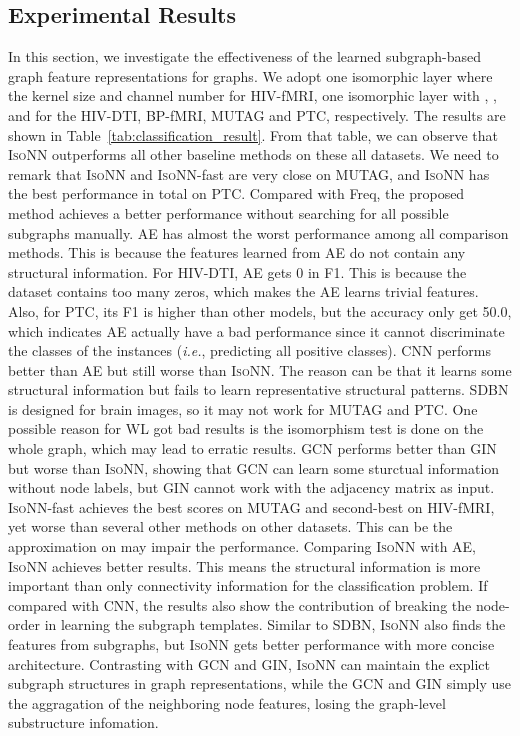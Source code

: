 \documentclass{article} \usepackage{iclr2020_conference,times}
\newcommand{\ie}[0]{\textit{i.e.}}
\newcommand{\our}{\textsc{IsoNN}}
\newcommand{\ourfast}{\textsc{IsoNN}-fast}
\begin{document}
\subsection{Experimental Results}
\vspace*{-8pt}
In this section, we investigate the effectiveness of the learned subgraph-based graph feature representations for graphs. We adopt one isomorphic layer where the kernel size  and channel number  for HIV-fMRI, one isomorphic layer with , ,  and  for the HIV-DTI, BP-fMRI, MUTAG and PTC, respectively. The results are shown in Table~\ref{tab:classification_result}. From that table, we can observe that {\our} outperforms all other baseline methods on these all datasets.  We need to remark that  {\our} and {\ourfast} are very close on MUTAG, and {\our} has the best performance in total on PTC. Compared with Freq, the proposed method achieves a better performance without searching for all possible subgraphs manually. AE has almost the worst performance among all comparison methods. This is because the features learned from AE do not contain any structural information. For HIV-DTI, AE gets 0 in F1. This is because the dataset contains too many zeros, which makes the AE learns trivial features. Also, for PTC, its F1 is higher than other models, but the accuracy only get 50.0, which indicates AE actually have a bad performance since it cannot discriminate the classes of the instances (\ie, predicting all positive classes).  CNN performs better than AE but still worse than {\our}. The reason can be that it learns some structural information but fails to learn representative structural patterns. SDBN is designed for brain images, so it may not work for MUTAG and PTC.  One possible reason for WL got bad results is the isomorphism test is done on the whole graph, which may lead to erratic results. GCN performs better than GIN but worse than {\our}, showing that GCN can learn some sturctual information without node labels, but GIN cannot work with the adjacency matrix as input. {\ourfast} achieves the best scores on MUTAG and  second-best on HIV-fMRI, yet worse than several other methods on other datasets. This can be the approximation on  may impair the performance.  Comparing {\our} with AE, {\our} achieves better results. This means the structural information is more important than only connectivity information for the classification problem. If compared with CNN, the results also show the contribution of breaking the node-order in learning the subgraph templates. Similar to SDBN,  {\our} also finds the features from subgraphs, but {\our} gets better performance with more concise architecture. Contrasting with GCN and GIN, {\our} can maintain the explict subgraph structures in graph representations, while the GCN and GIN simply use the aggragation of the neighboring node features, losing the graph-level substructure infomation.
\end{document}
